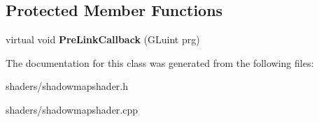 \subsection*{\-Protected \-Member \-Functions}
\begin{DoxyCompactItemize}
\item 
\hypertarget{classShadowMapShader_a17cf9dadcb7fdf7d06eb25cf1234adee}{virtual void {\bfseries \-Pre\-Link\-Callback} (\-G\-Luint prg)}\label{classShadowMapShader_a17cf9dadcb7fdf7d06eb25cf1234adee}

\end{DoxyCompactItemize}


\-The documentation for this class was generated from the following files\-:\begin{DoxyCompactItemize}
\item 
shaders/shadowmapshader.\-h\item 
shaders/shadowmapshader.\-cpp\end{DoxyCompactItemize}
